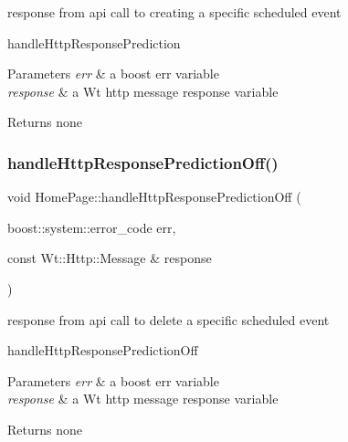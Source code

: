 response from api call to creating a specific scheduled event 

handle\+Http\+Response\+Prediction 
\begin{DoxyParams}{Parameters}
{\em err} & a boost err variable \\
\hline
{\em response} & a Wt http message response variable \\
\hline
\end{DoxyParams}
\begin{DoxyReturn}{Returns}
none 
\end{DoxyReturn}
\mbox{\label{class_home_page_a7f37c86187bf9bee98eb5f905422eb9c}} 
\subsubsection{\texorpdfstring{handle\+Http\+Response\+Prediction\+Off()}{handleHttpResponsePredictionOff()}}
{\footnotesize\ttfamily void Home\+Page\+::handle\+Http\+Response\+Prediction\+Off (\begin{DoxyParamCaption}\item[{boost\+::system\+::error\+\_\+code}]{err,  }\item[{const Wt\+::\+Http\+::\+Message \&}]{response }\end{DoxyParamCaption})\hspace{0.3cm}{\ttfamily [private]}}



response from api call to delete a specific scheduled event 

handle\+Http\+Response\+Prediction\+Off 
\begin{DoxyParams}{Parameters}
{\em err} & a boost err variable \\
\hline
{\em response} & a Wt http message response variable \\
\hline
\end{DoxyParams}
\begin{DoxyReturn}{Returns}
none 
\end{DoxyReturn}
\mbox{\label{class_home_page_a3ece53358d71e7a893cf4284dbcff175}} 
